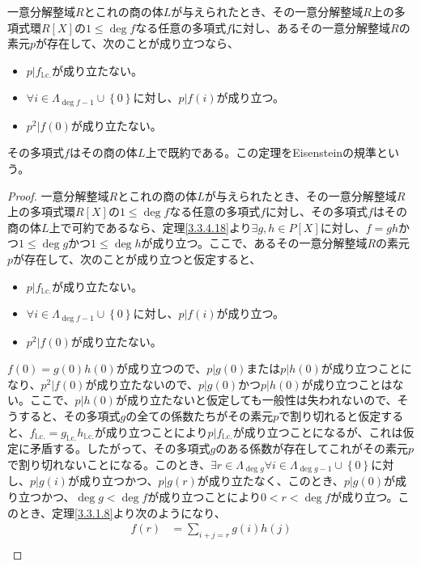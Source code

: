 \documentclass[dvipdfmx]{jsarticle}
\begin{document}
\begin{thm}[Eisensteinの規準]\label{3.3.5.14}
一意分解整域$R$とこれの商の体$L$が与えられたとき、その一意分解整域$R$上の多項式環$R[ X]$の$1 \leq \deg f$なる任意の多項式$f$に対し、あるその一意分解整域$R$の素元$p$が存在して、次のことが成り立つなら、
\begin{itemize}
\item
  $p|f_{\mathrm{l.c.}}$が成り立たない。
\item
  $\forall i \in \varLambda_{\deg f - 1} \cup \left\{ 0 \right\}$に対し、$p|f(i)$が成り立つ。
\item
  $p^{2}|f(0)$が成り立たない。
\end{itemize}
その多項式$f$はその商の体$L$上で既約である。この定理をEisensteinの規準という。
\end{thm}
\begin{proof}
一意分解整域$R$とこれの商の体$L$が与えられたとき、その一意分解整域$R$上の多項式環$R[ X]$の$1 \leq \deg f$なる任意の多項式$f$に対し、その多項式$f$はその商の体$L$上で可約であるなら、定理\ref{3.3.4.18}より$\exists g,h \in P[ X]$に対し、$f = gh$かつ$1 \leq \deg g$かつ$1 \leq \deg h$が成り立つ。ここで、あるその一意分解整域$R$の素元$p$が存在して、次のことが成り立つと仮定すると、
\begin{itemize}
\item
  $p|f_{\mathrm{l.c.}}$が成り立たない。
\item
  $\forall i \in \varLambda_{\deg f - 1} \cup \left\{ 0 \right\}$に対し、$p|f(i)$が成り立つ。
\item
  $p^{2}|f(0)$が成り立たない。
\end{itemize}
$f(0) = g(0)h(0)$が成り立つので、$p|g(0)$または$p|h(0)$が成り立つことになり、$p^{2}|f(0)$が成り立たないので、$p|g(0)$かつ$p|h(0)$が成り立つことはない。ここで、$p|h(0)$が成り立たないと仮定しても一般性は失われないので、そうすると、その多項式$g$の全ての係数たちがその素元$p$で割り切れると仮定すると、$f_{\mathrm{l.c.}} = g_{\mathrm{l.c.}}h_{\mathrm{l.c.}}$が成り立つことにより$p|f_{\mathrm{l.c.}}$が成り立つことになるが、これは仮定に矛盾する。したがって、その多項式$g$のある係数が存在してこれがその素元$p$で割り切れないことになる。このとき、$\exists r \in \varLambda_{\deg g}\forall i \in \varLambda_{\deg g - 1} \cup \left\{ 0 \right\}$に対し、$p|g(i)$が成り立つかつ、$p|g(r)$が成り立たなく、このとき、$p|g(0)$が成り立つかつ、$\deg g < \deg f$が成り立つことにより$0 < r < \deg f$が成り立つ。このとき、定理\ref{3.3.1.8}より次のようになり、
\begin{align*}
f(r) &= \sum_{i + j = r} {g(i)h(j)} \\

\end{align*}
\end{proof}
\end{document}

